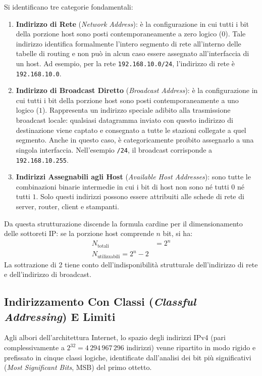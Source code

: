 \documentclass[11pt, a4paper]{article}
\begin{document}
Si identificano tre categorie fondamentali:
\begin{enumerate}
    \item \textbf{Indirizzo di Rete} (\emph{Network Address}): è la configurazione in cui tutti i bit della porzione host sono posti contemporaneamente a zero logico ($0$). Tale indirizzo identifica formalmente l'intero segmento di rete all'interno delle tabelle di routing e non può in alcun caso essere assegnato all'interfaccia di un host. Ad esempio, per la rete \texttt{192.168.10.0/24}, l'indirizzo di rete è \texttt{192.168.10.0}.
    \item \textbf{Indirizzo di Broadcast Diretto} (\emph{Broadcast Address}): è la configurazione in cui tutti i bit della porzione host sono posti contemporaneamente a uno logico ($1$). Rappresenta un indirizzo speciale adibito alla trasmissione broadcast locale: qualsiasi datagramma inviato con questo indirizzo di destinazione viene captato e consegnato a tutte le stazioni collegate a quel segmento. Anche in questo caso, è categoricamente proibito assegnarlo a una singola interfaccia. Nell'esempio \texttt{/24}, il broadcast corrisponde a \texttt{192.168.10.255}.
    \item \textbf{Indirizzi Assegnabili agli Host} (\emph{Available Host Addresses}): sono tutte le combinazioni binarie intermedie in cui i bit di host non sono né tutti $0$ né tutti $1$. Solo questi indirizzi possono essere attribuiti alle schede di rete di server, router, client e stampanti.
\end{enumerate}

Da questa strutturazione discende la formula cardine per il dimensionamento delle sottoreti IP: se la porzione host comprende $n$ bit, si ha:
\begin{align*}
N_{\text{totali}} &= 2^n \\
\boxed{N_{\text{utilizzabili}} = 2^n - 2}
\end{align*}
La sottrazione di 2 tiene conto dell'indisponibilità strutturale dell'indirizzo di rete e dell'indirizzo di broadcast.

\subsection{Indirizzamento Con Classi (\emph{Classful Addressing}) E Limiti}
Agli albori dell'architettura Internet, lo spazio degli indirizzi IPv4 (pari complessivamente a $2^{32} = 4\,294\,967\,296$ indirizzi) venne ripartito in modo rigido e prefissato in cinque classi logiche, identificate dall'analisi dei bit più significativi (\emph{Most Significant Bits}, MSB) del primo ottetto.
\end{document}
